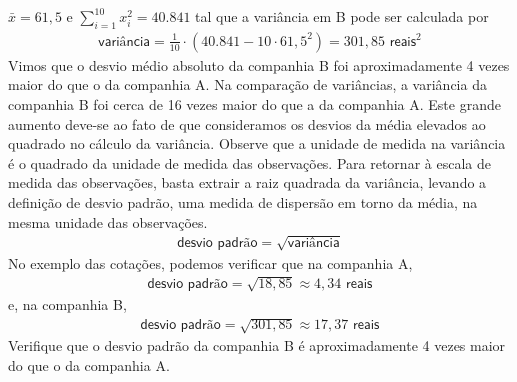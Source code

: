 \(\bar{x}=61,5\) e \(\displaystyle{\sum^{10}_{i=1}} x^2_i=40.841\) tal que a variância em B pode ser calculada por
\begin{equation*}
\begin{split}\textsf{variância}=\frac{1}{10}\cdot (40.841-10\cdot 61,5^2)=301,85\textsf{ reais}^2\end{split}
\end{equation*}
Vimos que o desvio médio absoluto da companhia B foi aproximadamente 4 vezes maior do que o da companhia A. Na comparação de variâncias, a variância da companhia B foi cerca de 16 vezes maior do que a da companhia A. Este grande aumento deve-se ao fato de que consideramos os desvios da média elevados ao quadrado no cálculo da variância. Observe que a unidade de medida na variância é o quadrado da unidade de medida das observações. Para retornar à escala de medida das observações, basta extrair a raiz quadrada da variância, levando a definição de desvio padrão, uma medida de dispersão em torno da média, na mesma unidade das observações.
\begin{equation*}
\begin{split}\textsf{desvio padrão}=\sqrt{\textsf{variância}}\end{split}
\end{equation*}
No exemplo das cotações, podemos verificar que na companhia A,
\begin{equation*}
\begin{split}\textsf{desvio padrão}=\sqrt{18,85} \approx 4,34 \textsf{ reais}\end{split}
\end{equation*}
e, na companhia B,
\begin{equation*}
\begin{split}\textsf{desvio padrão}=\sqrt{301,85}\approx 17,37\textsf{ reais}\end{split}
\end{equation*}
Verifique que o desvio padrão da companhia B é aproximadamente 4 vezes maior do que o da companhia A.

